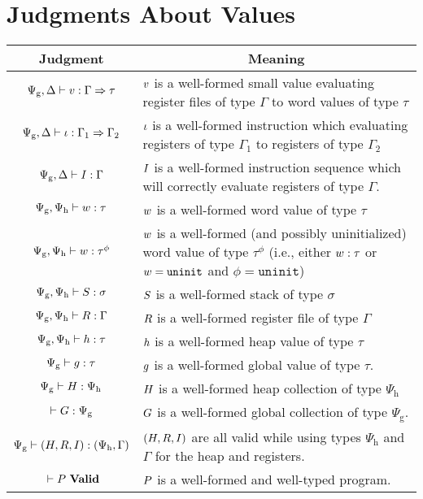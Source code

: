 \section{Judgments About Values}
\begin{tabular}{|c|p{7.5 cm}|}
  \hline
  Judgment & \multicolumn{1}{|c|}{Meaning} \\
  \hline

  $\Psi_{\mathrm{g}}, \Delta |- v : \Gamma => \tau$ & $v$ is a well-formed small value evaluating register files of type $\Gamma$ to word values of type $\tau$ \\
  $\Psi_{\mathrm{g}}, \Delta |- \iota : \Gamma_1 => \Gamma_2$ & $\iota$ is a well-formed instruction which evaluating registers of type $\Gamma_1$ to registers of type $\Gamma_2$ \\
  $\Psi_{\mathrm{g}}, \Delta |- I : \Gamma$ & $I$ is a well-formed instruction sequence which will correctly evaluate registers of type $\Gamma$. \\
  \hline

  $\Psi_{\mathrm{g}}, \Psi_{\mathrm{h}} |- w : \tau$ & $w$ is a well-formed word value of type $\tau$ \\
  $\Psi_{\mathrm{g}}, \Psi_{\mathrm{h}} |- w : \tau^{\phi}$ & $w$ is a well-formed (and possibly uninitialized) word value of type $\tau^\phi$ (i.e., either $w : \tau$ or $w = \mathtt{uninit}$ and $\phi = \mathtt{uninit}$) \\
  $\Psi_{\mathrm{g}}, \Psi_{\mathrm{h}} |- S : \sigma$ & $S$ is a well-formed stack of type $\sigma$ \\
  $\Psi_{\mathrm{g}}, \Psi_{\mathrm{h}} |- R : \Gamma$ & $R$ is a well-formed register file of type $\Gamma$ \\
  $\Psi_{\mathrm{g}}, \Psi_{\mathrm{h}} |- h : \tau$ & $h$ is a well-formed heap value of type $\tau$ \\
  $\Psi_{\mathrm{g}} |- g : \tau$ & $g$ is a well-formed global value of type $\tau$. \\
  $\Psi_{\mathrm{g}} |- H : \Psi_{\mathrm{h}}$ & $H$ is a well-formed heap collection of type $\Psi_{\mathrm{h}}$ \\
  $|- G : \Psi_{\mathrm{g}}$ & $G$ is a well-formed global collection of type $\Psi_{\mathrm{g}}$. \\
  \hline

  $\Psi_{\mathrm{g}} |- (H, R, I) : (\Psi_{\mathrm{h}}, \Gamma)$ & $(H, R, I)$ are all valid while using types $\Psi_{\mathrm{h}}$ and $\Gamma$ for the heap and registers. \\
  ${} |- {P}\ \mathbf{Valid}$ & $P$ is a well-formed and well-typed program. \\
  \hline
\end{tabular}

